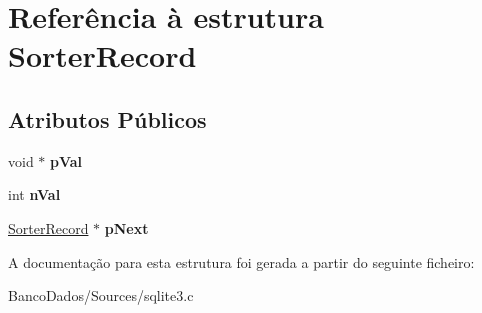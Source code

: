 \hypertarget{struct_sorter_record}{\section{Referência à estrutura Sorter\-Record}
\label{struct_sorter_record}
}
\subsection*{Atributos Públicos}
\begin{DoxyCompactItemize}
\item 
\hypertarget{struct_sorter_record_af59daa686859ca44f7f0be92b3f0d133}{void $\ast$ {\bfseries p\-Val}}\label{struct_sorter_record_af59daa686859ca44f7f0be92b3f0d133}

\item 
\hypertarget{struct_sorter_record_a2b8ffc0f8410826de8b41425759bf462}{int {\bfseries n\-Val}}\label{struct_sorter_record_a2b8ffc0f8410826de8b41425759bf462}

\item 
\hypertarget{struct_sorter_record_a08fdaa8302834166f6a8d12e09c95b58}{\hyperlink{struct_sorter_record}{Sorter\-Record} $\ast$ {\bfseries p\-Next}}\label{struct_sorter_record_a08fdaa8302834166f6a8d12e09c95b58}

\end{DoxyCompactItemize}


A documentação para esta estrutura foi gerada a partir do seguinte ficheiro\-:\begin{DoxyCompactItemize}
\item 
Banco\-Dados/\-Sources/sqlite3.\-c\end{DoxyCompactItemize}
